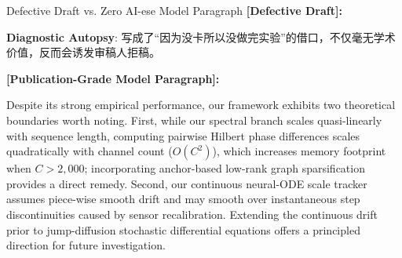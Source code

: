 \begin{ExampleBox}{Defective Draft vs. Zero AI-ese Model Paragraph}
\textbf{\color{TargetHighlight}[Defective Draft]:}\par
{}\par\vspace{4pt}
\textbf{Diagnostic Autopsy}: 写成了“因为没卡所以没做完实验”的借口，不仅毫无学术价值，反而会诱发审稿人拒稿。\par\vspace{6pt}
\textbf{\color{AcadNavy}[Publication-Grade Model Paragraph]:}\par
Despite its strong empirical performance, our framework exhibits two theoretical boundaries worth noting. First, while our spectral branch scales quasi-linearly with sequence length, computing pairwise Hilbert phase differences scales quadratically with channel count ($O(C^2)$), which increases memory footprint when $C > 2,000$; incorporating anchor-based low-rank graph sparsification provides a direct remedy. Second, our continuous neural-ODE scale tracker assumes piece-wise smooth drift and may smooth over instantaneous step discontinuities caused by sensor recalibration. Extending the continuous drift prior to jump-diffusion stochastic differential equations offers a principled direction for future investigation.
\end{ExampleBox}
